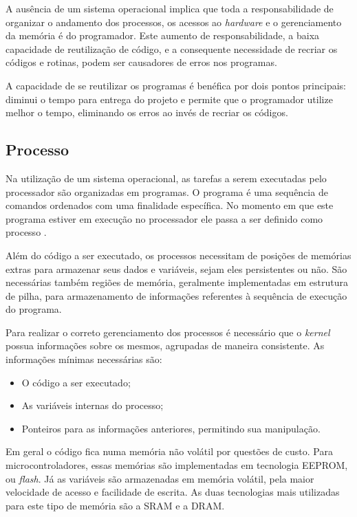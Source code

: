 \documentclass[12pt,openright,oneside,a4paper,brazil]{abntex2}
\begin{document}
A ausência de um sistema operacional implica que toda a responsabilidade de organizar o andamento dos processos, os acessos ao \textit{hardware} e o gerenciamento da memória é do programador. Este aumento de responsabilidade, a baixa capacidade de reutilização de código, e a consequente necessidade de recriar os códigos e rotinas, podem ser causadores de erros nos programas.

A capacidade de se reutilizar os programas é benéfica por dois pontos principais: diminui o tempo para entrega do projeto e permite que o programador utilize melhor o tempo, eliminando os erros ao invés de recriar os códigos.


\subsection{Processo}
Na utilização de um sistema operacional, as tarefas a serem executadas pelo processador são organizadas em programas. O programa é uma sequência de comandos ordenados com uma finalidade específica. No momento em que este programa estiver em execução no processador ele passa a ser definido como processo \cite{stallings2009operating}.

Além do código a ser executado, os processos necessitam de posições de memórias extras para armazenar seus dados e variáveis, sejam eles persistentes ou não. São necessárias também regiões de memória, geralmente implementadas em estrutura de pilha, para armazenamento de informações referentes à sequência de execução do programa.

Para realizar o correto gerenciamento dos processos é necessário que o \textit{kernel} possua informações sobre os mesmos, agrupadas de maneira consistente. As informações mínimas necessárias são:

\begin{itemize}
	\item O código a ser executado;
	\item As variáveis internas do processo;
	\item Ponteiros para as informações anteriores, permitindo sua manipulação.
\end{itemize}

Em geral o código fica numa memória não volátil por questões de custo. Para microcontroladores, essas memórias são implementadas em tecnologia EEPROM, ou \textit{flash}. Já as variáveis são armazenadas em memória volátil, pela maior velocidade de acesso e facilidade de escrita. As duas tecnologias mais utilizadas para este tipo de memória são a SRAM e a DRAM.
\end{document}
